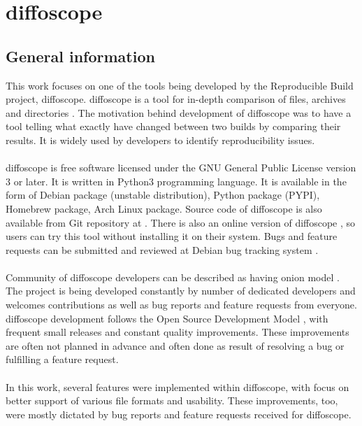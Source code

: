 \section{diffoscope}

\subsection[General information]{General information}
This work focuses on one of the tools being developed by the
Reproducible Build project, diffoscope.
diffoscope is a tool for in-depth comparison of files, archives and
directories \autocite{dfs}.
The motivation behind development of diffoscope was to have a tool
telling what exactly have changed between two builds by comparing
their results. It is widely used by developers to identify reproducibility issues.\\\\
diffoscope is free software licensed under the GNU General Public
License version 3 or later. It is written in Python3 programming language.
It is available in the form of Debian package (unstable distribution),
Python package (PYPI), Homebrew package, Arch Linux package. Source code
of diffoscope is also available from Git repository at \autocite{dfs-git}.
There is also an online version of diffoscope \autocite{try-dfs}, so users
can try this tool without installing it on their system.
Bugs and feature requests can be submitted and reviewed at Debian
bug tracking system \autocite{dfs-bugs}.\\\\
Community of diffoscope developers can be described as having
onion model \autocite{aberdour2007achieving}.
The project is being developed constantly by number of dedicated
developers and welcomes contributions as well as bug reports
and feature requests from everyone.
diffoscope development follows the Open Source Development Model
\autocite{osdm}, with frequent small releases and constant quality improvements.
These improvements are often not planned in advance and often
done as result of resolving a bug or fulfilling a feature request.\\\\
In this work, several features were implemented  within diffoscope,
with focus on better support of various file formats and usability.
These improvements, too, were mostly dictated by bug reports and feature requests
received for diffoscope.

